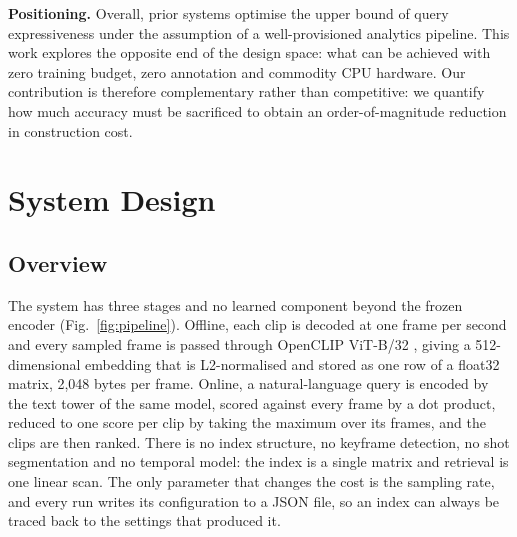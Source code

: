 \documentclass[journal]{IEEEtran}
\begin{document}
\noindent\textbf{Positioning.}
Overall, prior systems optimise the upper bound of query expressiveness under the assumption of
a well-provisioned analytics pipeline. This work explores the opposite end of the design space:
what can be achieved with zero training budget, zero annotation and commodity CPU hardware. Our
contribution is therefore complementary rather than competitive: we quantify how much accuracy
must be sacrificed to obtain an order-of-magnitude reduction in construction cost.

\section{System Design}

\subsection{Overview}
The system has three stages and no learned component beyond the frozen encoder
(Fig.~\ref{fig:pipeline}). Offline, each
clip is decoded at one frame per second and every sampled frame is passed through OpenCLIP
ViT-B/32 \cite{cherti2023reproducible}, giving a 512-dimensional embedding that is
L2-normalised and stored as one row of a float32 matrix, 2{,}048 bytes per frame. Online, a
natural-language query is encoded by the text tower of the same model, scored against every
frame by a dot product, reduced to one score per clip by taking the maximum over its frames,
and the clips are then ranked. There is no index structure, no keyframe detection, no shot
segmentation and no temporal model: the index is a single matrix and retrieval is one linear
scan. The only parameter that changes the cost is the sampling rate, and every run writes its
configuration to a JSON file, so an index can always be traced back to the settings that
produced it.
\end{document}
